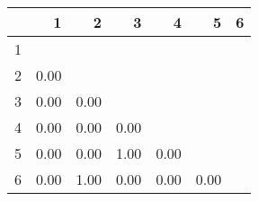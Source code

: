 \begin{tabular}{r|rrrrrr}
  & 1 & 2 & 3 & 4 & 5 & 6 \\ 
  \hline
1 &  &  &  &  &  &  \\ 
  2 & 0.00 &  &  &  &  &  \\ 
  3 & 0.00 & 0.00 &  &  &  &  \\ 
  4 & 0.00 & 0.00 & 0.00 &  &  &  \\ 
  5 & 0.00 & 0.00 & 1.00 & 0.00 &  &  \\ 
  6 & 0.00 & 1.00 & 0.00 & 0.00 & 0.00 &  \\ 
   \hline
\end{tabular}
